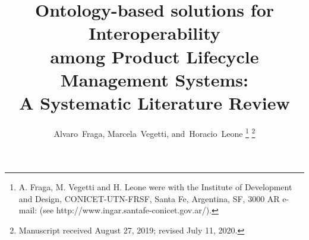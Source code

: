 \documentclass[peerreview]{IEEEtran}
\begin{document}
%
\title{Ontology-based solutions for Interoperability \\ among Product Lifecycle Management Systems: \\A Systematic Literature Review}
%
%
%

\author{Alvaro~Fraga,
        Marcela~Vegetti,
        and~Horacio~Leone%
\thanks{A. Fraga, M. Vegetti and H. Leone were with the Institute
of Development and Design, CONICET-UTN-FRSF, Santa Fe, Argentina,
SF, 3000 AR e-mail: (see http://www.ingar.santafe-conicet.gov.ar/).}%
\thanks{Manuscript received August 27, 2019; revised July 11, 2020.}}

% 
%
\end{document}
